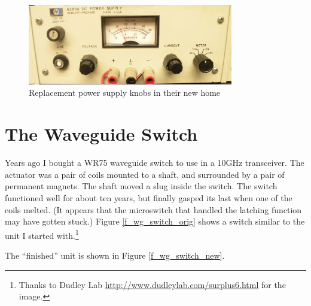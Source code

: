 \documentclass[12pt]{article}
\begin{document}
\begin{figure}[tb]
  \centering
  \includegraphics[width=0.8\textwidth]{PSKnobs.jpg}
  \caption{\label{f_knobs_on_box}Replacement power supply knobs in their new home}
\end{figure}

\section{The Waveguide Switch}

Years ago I bought a WR75 waveguide switch to use in a 10GHz transceiver.
The actuator was a pair of coils mounted to a shaft, and surrounded by
a pair of permanent magnets.  The shaft moved a slug inside the switch.
The switch functioned well for about ten years, but finally gasped its last
when one of the coils melted. (It appears that the microswitch that
handled the latching function may have gotten stuck.)
Figure \ref{f_wg_switch_orig} shows a switch similar to the unit I started
with.\footnote{Thanks to Dudley Lab \url{http://www.dudleylab.com/surplus6.html}
  for the image.}

The ``finished'' unit is shown in Figure \ref{f_wg_switch_new}. 
\end{document}
